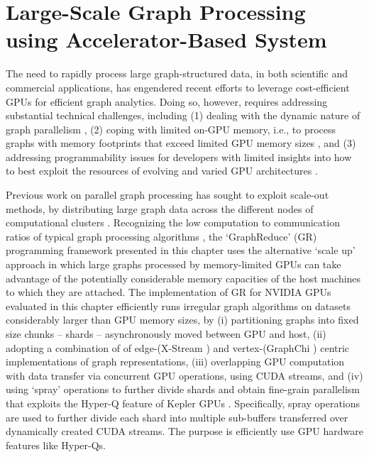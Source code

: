 \chapter{Large-Scale Graph Processing using Accelerator-Based System}
The need to rapidly process large graph-structured data, in both scientific and commercial applications, has engendered
recent efforts to leverage cost-efficient GPUs \cite{Rain, Strings} for efficient graph analytics. Doing so, however, requires
addressing substantial technical challenges, including (1) dealing with the dynamic nature of graph parallelism \cite{medusa, mapgraph, cusha, naila}, (2) coping with limited on-GPU memory, i.e., to process graphs with memory footprints
that exceed limited GPU memory sizes \cite{chi, xstream}, and (3) addressing programmability issues for developers with limited
insights into how to best exploit the resources of evolving and varied GPU architectures \cite{ppl,pact,jure}.

Previous work on parallel graph processing has sought to exploit scale-out methods, by distributing
large graph data across the different nodes of computational clusters \cite{graphlab}. Recognizing the low computation to 
communication ratios of typical graph processing algorithms \cite{chi,xstream}, the `GraphReduce' (GR) programming
framework presented in this chapter uses the alternative `scale up' approach in which large graphs processed 
by memory-limited GPUs can take advantage of the potentially considerable memory capacities of the host machines 
to which they are attached. The implementation of GR for NVIDIA GPUs evaluated in this chapter efficiently runs 
irregular graph algorithms on datasets considerably larger than GPU memory sizes, by (i) partitioning graphs into
fixed size chunks -- shards -- asynchronously moved between GPU and host, (ii) adopting a combination of 
of edge-(X-Stream \cite{xstream}) and vertex-(GraphChi \cite{chi}) centric implementations of graph representations,
(iii) overlapping GPU computation with data transfer via concurrent GPU operations, using CUDA streams, and 
(iv) using `spray' operations to further divide shards and obtain fine-grain parallelism that exploits the 
Hyper-Q feature of Kepler GPUs \cite{kepler}. Specifically, spray operations are used to further divide each shard into multiple 
sub-buffers transferred over dynamically created CUDA streams. The purpose is efficiently use GPU hardware features
like Hyper-Qs.

